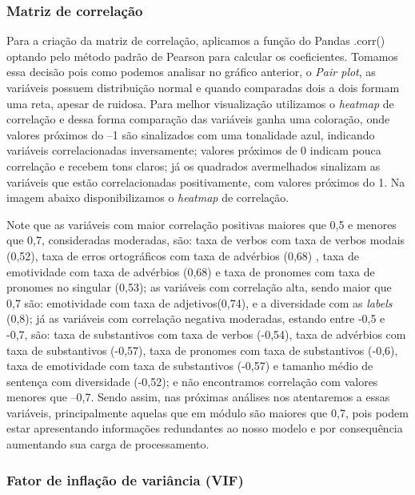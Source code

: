 \documentclass[
  brazilian,
  11pt,
]{article}
\begin{document}
\subsubsection{Matriz de correlação}\label{matriz-de-correlauxe7uxe3o}

Para a criação da matriz de correlação, aplicamos a função do Pandas .corr() optando pelo método padrão de Pearson para calcular os coeficientes. Tomamos essa decisão pois como podemos analisar no gráfico anterior, o \emph{Pair plot}, as variáveis possuem distribuição normal e quando comparadas dois a dois formam uma reta, apesar de ruidosa. Para melhor visualização utilizamos o \emph{heatmap} de correlação e dessa forma comparação das variáveis ganha uma coloração, onde valores próximos do --1 são sinalizados com uma tonalidade azul, indicando variáveis correlacionadas inversamente; valores próximos de 0 indicam pouca correlação e recebem tons claros; já os quadrados avermelhados sinalizam as variáveis que estão correlacionadas positivamente, com valores próximos do 1. Na imagem abaixo disponibilizamos o \emph{heatmap} de correlação.

Note que as variáveis com maior correlação positivas maiores que 0,5 e menores que 0,7, consideradas moderadas, são: taxa de verbos com taxa de verbos modais (0,52), taxa de erros ortográficos com taxa de advérbios (0,68) , taxa de emotividade com taxa de advérbios (0,68) e taxa de pronomes com taxa de pronomes no singular (0,53); as variáveis com correlação alta, sendo maior que 0,7 são: emotividade com taxa de adjetivos(0,74), e a diversidade com as \emph{labels} (0,8); já as variáveis com correlação negativa moderadas, estando entre -0,5 e -0,7, são: taxa de substantivos com taxa de verbos (-0,54), taxa de advérbios com taxa de substantivos (-0,57), taxa de pronomes com taxa de substantivos (-0,6), taxa de emotividade com taxa de substantivos (-0,57) e tamanho médio de sentença com diversidade (-0,52); e não encontramos correlação com valores menores que --0,7. Sendo assim, nas próximas análises nos atentaremos a essas variáveis, principalmente aquelas que em módulo são maiores que 0,7, pois podem estar apresentando informações redundantes ao nosso modelo e por consequência aumentando sua carga de processamento.

\subsubsection{Fator de inflação de variância (VIF)}\label{fator-de-inflauxe7uxe3o-de-variuxe2ncia-vif}
\end{document}
